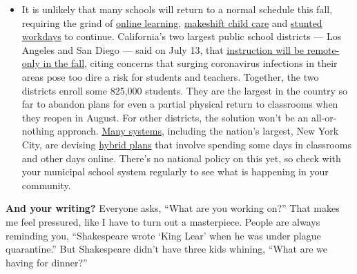\begin{itemize}
  \begin{itemize}
  \tightlist
  \item
    It is unlikely that many schools will return to a normal schedule
    this fall, requiring the grind of
    \href{https://www.nytimes3xbfgragh.onion/2020/06/05/us/coronavirus-education-lost-learning.html?action=click\&pgtype=Article\&state=default\&region=MAIN_CONTENT_3\&context=storylines_faq}{online
    learning},
    \href{https://www.nytimes3xbfgragh.onion/2020/05/29/us/coronavirus-child-care-centers.html?action=click\&pgtype=Article\&state=default\&region=MAIN_CONTENT_3\&context=storylines_faq}{makeshift
    child care} and
    \href{https://www.nytimes3xbfgragh.onion/2020/06/03/business/economy/coronavirus-working-women.html?action=click\&pgtype=Article\&state=default\&region=MAIN_CONTENT_3\&context=storylines_faq}{stunted
    workdays} to continue. California's two largest public school
    districts --- Los Angeles and San Diego --- said on July 13, that
    \href{https://www.nytimes3xbfgragh.onion/2020/07/13/us/lausd-san-diego-school-reopening.html?action=click\&pgtype=Article\&state=default\&region=MAIN_CONTENT_3\&context=storylines_faq}{instruction
    will be remote-only in the fall}, citing concerns that surging
    coronavirus infections in their areas pose too dire a risk for
    students and teachers. Together, the two districts enroll some
    825,000 students. They are the largest in the country so far to
    abandon plans for even a partial physical return to classrooms when
    they reopen in August. For other districts, the solution won't be an
    all-or-nothing approach.
    \href{https://bioethics.jhu.edu/research-and-outreach/projects/eschool-initiative/school-policy-tracker/}{Many
    systems}, including the nation's largest, New York City, are
    devising
    \href{https://www.nytimes3xbfgragh.onion/2020/06/26/us/coronavirus-schools-reopen-fall.html?action=click\&pgtype=Article\&state=default\&region=MAIN_CONTENT_3\&context=storylines_faq}{hybrid
    plans} that involve spending some days in classrooms and other days
    online. There's no national policy on this yet, so check with your
    municipal school system regularly to see what is happening in your
    community.
  \end{itemize}
\end{itemize}

\textbf{And your writing?} Everyone asks, ``What are you working on?''
That makes me feel pressured, like I have to turn out a masterpiece.
People are always reminding you, ``Shakespeare wrote `King Lear' when he
was under plague quarantine.'' But Shakespeare didn't have three kids
whining, ``What are we having for dinner?''

